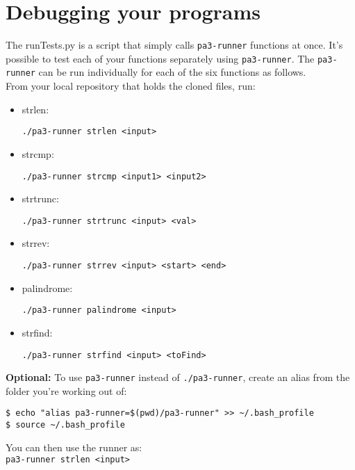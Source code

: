 \documentclass{article}
\begin{document}
\section{Debugging your programs}
The runTests.py is a script that simply calls \texttt{pa3-runner} functions at once. It's possible to test each of your functions separately using \texttt{pa3-runner}. The \texttt{pa3-runner} can be run individually for each of the six functions as follows.\\
From your local repository that holds the cloned files, run:

\begin{itemize}
\item strlen:
\begin{verbatim}
./pa3-runner strlen <input>
\end{verbatim}
\item strcmp:
\begin{verbatim}
./pa3-runner strcmp <input1> <input2>
\end{verbatim}
\item strtrunc:
\begin{verbatim}
./pa3-runner strtrunc <input> <val>
\end{verbatim}
\item strrev:
\begin{verbatim}
./pa3-runner strrev <input> <start> <end>
\end{verbatim}
\item palindrome:
\begin{verbatim}
./pa3-runner palindrome <input>
\end{verbatim}
\item strfind:
\begin{verbatim}
./pa3-runner strfind <input> <toFind>
\end{verbatim}
\end{itemize}

\textbf{Optional:}
To use \texttt{pa3-runner} instead of \texttt{./pa3-runner}, create an alias from the folder you're working out of:
\begin{verbatim}
$ echo "alias pa3-runner=$(pwd)/pa3-runner" >> ~/.bash_profile
$ source ~/.bash_profile
\end{verbatim}
You can then use the runner as:\\
\texttt{pa3-runner strlen <input>}
\end{document}
